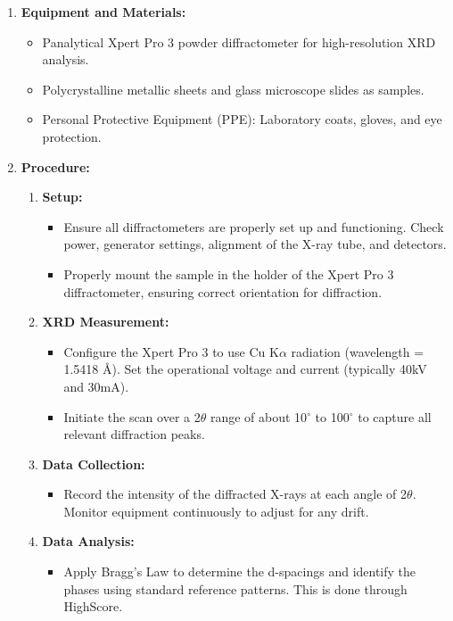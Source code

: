 \documentclass[11pt]{article}
\begin{document}
	\begin{enumerate}
		\item \textbf{Equipment and Materials:}
		\begin{itemize}
			\item Panalytical Xpert Pro 3 powder diffractometer for high-resolution XRD analysis.
			\item Polycrystalline metallic sheets and glass microscope slides as samples.
			\item Personal Protective Equipment (PPE): Laboratory coats, gloves, and eye protection.
		\end{itemize}
		
		\item \textbf{Procedure:}
		\begin{enumerate}
			\item \textbf{Setup:}
			\begin{itemize}
				\item Ensure all diffractometers are properly set up and functioning. Check power, generator settings, alignment of the X-ray tube, and detectors.
				\item Properly mount the sample in the holder of the Xpert Pro 3 diffractometer, ensuring correct orientation for diffraction.
			\end{itemize}
			
			\item \textbf{XRD Measurement:}
			\begin{itemize}
				\item Configure the Xpert Pro 3 to use Cu K$\alpha$ radiation (wavelength = 1.5418 \AA). Set the operational voltage and current (typically 40kV and 30mA).
				\item Initiate the scan over a 2$\theta$ range of about 10$^\circ$ to 100$^\circ$ to capture all relevant diffraction peaks.
			\end{itemize}
			
			\item \textbf{Data Collection:}
			\begin{itemize}
				\item Record the intensity of the diffracted X-rays at each angle of 2$\theta$. Monitor equipment continuously to adjust for any drift.
			\end{itemize}
			
			\item \textbf{Data Analysis:}
			\begin{itemize}
				\item Apply Bragg's Law to determine the d-spacings and identify the phases using standard reference patterns. This is done through HighScore.
			\end{itemize}
			

\end{enumerate}
\end{enumerate}
\end{document}
